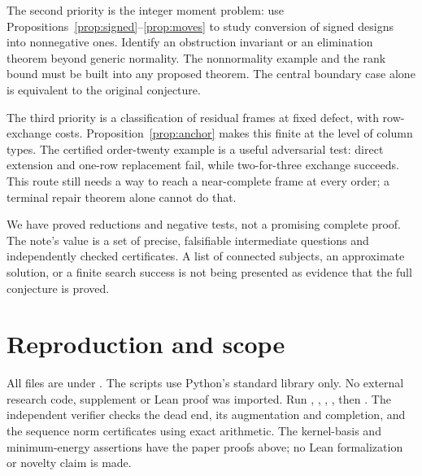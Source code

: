 \documentclass[11pt]{article}
\begin{document}
The second priority is the integer moment problem: use
Propositions~\ref{prop:signed}--\ref{prop:moves} to study conversion of
signed designs into nonnegative ones. Identify an obstruction invariant
or an elimination theorem beyond generic normality. The nonnormality
example and the rank bound must be built into any proposed theorem.
The central boundary case alone is equivalent to the original conjecture.

The third priority is a classification of residual frames at fixed
defect, with row-exchange costs. Proposition~\ref{prop:anchor} makes
this finite at the level of column types. The certified order-twenty
example is a useful adversarial test: direct extension and one-row
replacement fail, while two-for-three exchange succeeds. This route
still needs a way to reach a near-complete frame at every order; a
terminal repair theorem alone cannot do that.

We have proved reductions and negative tests, not a promising complete
proof. The note's value is a set of precise, falsifiable intermediate
questions and independently checked certificates. A list of connected
subjects, an approximate solution, or a finite search success is not
being presented as evidence that the full conjecture is proved.

\section{Reproduction and scope}
All files are under . The scripts use
Python's standard library only. No external research code, supplement
or Lean proof was imported. Run ,
, ,
, then .
The independent verifier checks the dead end, its augmentation and
completion, and the sequence norm certificates using exact arithmetic.
The kernel-basis and minimum-energy assertions have the paper proofs
above; no Lean formalization or novelty claim is made.
\end{document}
